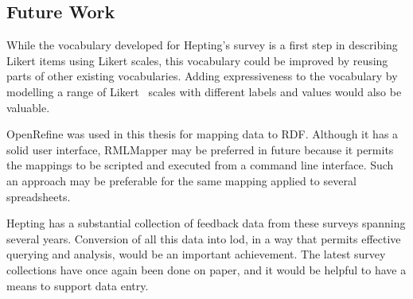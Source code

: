 \begin{doublespace}
\section{Future Work}
\label{sec:futurework}

While the vocabulary developed for Hepting's survey is a first step in describing
Likert items using Likert scales, this vocabulary could be improved by reusing parts of
other existing vocabularies. Adding expressiveness to the vocabulary by modelling a range of Likert~\cite{south2022effective} scales with different labels and values would also be valuable.

OpenRefine was used in this thesis for mapping data to RDF.
Although it has a solid user interface, RMLMapper may be preferred in
future because it permits the mappings to be scripted and executed from
a command line interface. Such an approach may be preferable for the same
mapping applied to several spreadsheets.

Hepting has a substantial collection of feedback data from these surveys spanning
several years. Conversion of all this data into \ac{lod}, in a way that permits
effective querying and analysis, would be an important achievement. The latest
survey collections have once again been done on paper, and it would be helpful
to have a means to support data entry.

\end{doublespace}